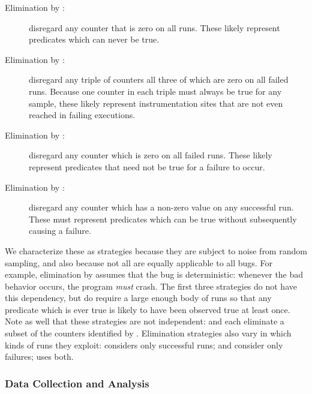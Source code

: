\begin{description}\sloppy
\item[Elimination by \elim{universal falsehood}:] disregard any
  counter that is zero on all runs.  These likely represent predicates
  which can never be true.
  
\item[Elimination by \elim{lack of failing coverage}:] disregard any
  triple of counters all three of which are zero on all failed runs.
  Because one counter in each triple must always be true for any
  sample, these likely represent instrumentation sites that are not
  even reached in failing executions.
  
\item[Elimination by \elim{lack of failing example}:] disregard any
  counter which is zero on all failed runs.  These likely represent
  predicates that need not be true for a failure to occur.
  
\item[Elimination by \elim{successful counterexample}:] disregard any
  counter which has a non-zero value on any successful run.  These
  must represent predicates which can be true without subsequently
  causing a failure.
\end{description}

We characterize these as strategies because they are subject to noise
from random sampling, and also because not all are equally applicable
to all bugs.  For example, elimination by  assumes that the bug is deterministic: whenever the
bad behavior occurs, the program \emph{must} crash.  The first three
strategies do not have this dependency, but do require a large enough
body of runs so that any predicate which is ever true is likely to
have been observed true at least once.  Note as well that these
strategies are not independent:  and
 each eliminate a subset of the
counters identified by .  Elimination
strategies also vary in which kinds of runs they exploit:
 considers only successful runs;
 and 
consider only failures;  uses both.

\subsubsection{Data Collection and Analysis}


